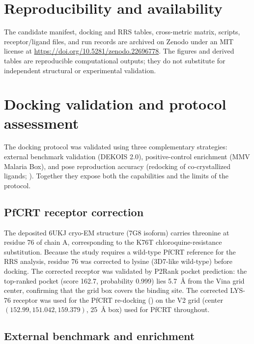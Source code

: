 \documentclass[journal=jcisd8,manuscript=suppinfo]{achemso}
\begin{document}
\section{Reproducibility and availability}\label{sec:sm_repro}
The candidate manifest, docking and RRS tables, cross-metric matrix, scripts, receptor/ligand files, and run records are archived on Zenodo under an MIT license at \url{https://doi.org/10.5281/zenodo.22696778}. The figures and derived tables are reproducible computational outputs; they do not substitute for independent structural or experimental validation.

\section{Docking validation and protocol assessment}\label{sec:sm_validation}
The docking protocol was validated using three complementary strategies: external benchmark validation (DEKOIS 2.0), positive-control enrichment (MMV Malaria Box), and pose reproduction accuracy (redocking of co-crystallized ligands; ). Together they expose both the capabilities and the limits of the protocol.

\subsection{PfCRT receptor correction}\label{sec:sm_val_crt}
The deposited 6UKJ cryo-EM structure (7G8 isoform) carries threonine at residue 76 of chain A, corresponding to the K76T chloroquine-resistance substitution. Because the study requires a wild-type PfCRT reference for the RRS analysis, residue 76 was corrected to lysine (3D7-like wild-type) before docking. The corrected receptor was validated by P2Rank pocket prediction: the top-ranked pocket (score 162.7, probability 0.999) lies \qty{5.7}{\angstrom} from the Vina grid center, confirming that the grid box covers the binding site. The corrected LYS-76 receptor was used for the PfCRT re-docking () on the V2 grid (center $(\num{152.99}, \num{151.042}, \num{159.379})$, \qty{25}{\angstrom} box) used for PfCRT throughout.

\subsection{External benchmark and enrichment}\label{sec:sm_val_dekois}

\end{document}
